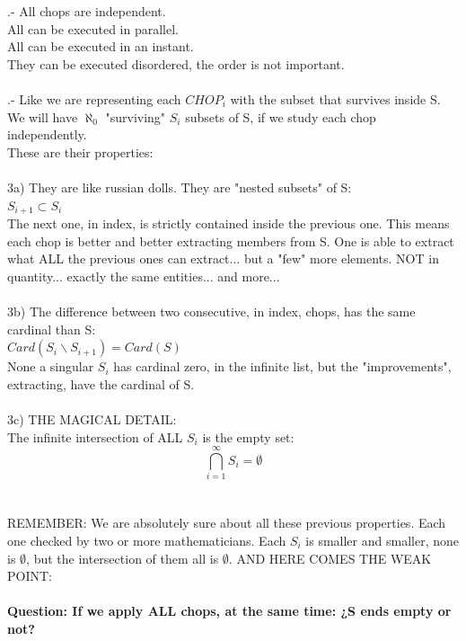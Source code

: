 		.- All chops are independent.\\
		All can be executed in parallel.\\
		All can be executed in an instant.\\
		They can be executed disordered, the order is not important.
		\\\\
		
		.- Like we are representing each $CHOP_{i}$ with the subset that survives inside S.\\
		We will have $\aleph_{0}$ "surviving" $S_{i}$ subsets of S, if we study each chop independently.\\
		These are their properties:\\\\
		3a) They are like russian dolls. They are "nested subsets" of S:\\
		$S_{i+1} \subset   S_{i}$\\
		The next one, in index, is strictly contained inside the previous one. This means each chop is better and better extracting members from S. One is able to extract what ALL the previous ones can extract... but a "few" more elements. NOT in quantity... exactly the same entities... and more...\\\\
		3b) The difference between two consecutive, in index, chops, has the same cardinal than S:\\
		$Card (   S_{i} \backslash S_{i+1}   ) = Card (S)$\\
		None a singular $S_{i}$ has cardinal zero, in the infinite list, but the "improvements", extracting, have the cardinal of S.\\\\
		3c) THE MAGICAL DETAIL:\\
		The infinite intersection of ALL $S_{i}$ is the empty set:\\
		$$ \bigcap_{i=1}^{\infty} S_{i} = \emptyset $$
		\\\\
		
		\noindent
		REMEMBER: We are absolutely sure about all these previous properties. Each one checked by two or more mathematicians. Each $S_{i}$ is smaller and smaller, none is $\emptyset$, but the intersection of them all is $\emptyset$. AND HERE COMES THE WEAK POINT:
		\\\\
		
		\noindent
		\textbf{Question: If we apply ALL chops, at the same time: ¿S ends empty or not?}
		\\\\
		
